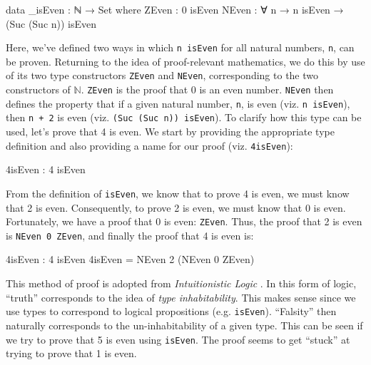 \documentclass[12pt]{article}
\begin{document}
\begin{center}
\begin{minipage}{0.7\textwidth}
\begin{code}
data _isEven : ℕ → Set where
  ZEven : 0 isEven
  NEven : ∀ n → n isEven → (Suc (Suc n)) isEven
\end{code}
\end{minipage}
\end{center}
Here, we've defined two ways in which {\tt n isEven} for all natural numbers,
{\tt n}, can be proven. Returning to the idea of proof-relevant mathematics,
we do this by use of its two type constructors {\tt ZEven} and {\tt NEven},
corresponding to the two constructors of \(\mathbb{N}\). {\tt ZEven} is the
proof that 0 is an even number. {\tt NEven} then defines the property that if
a given natural number, {\tt n}, is even (viz. {\tt n isEven}), then {\tt n + 2}
is even (viz. {\tt (Suc (Suc n)) isEven}). To clarify how this type can be used,
let's prove that 4 is even. We start by providing the appropriate type definition
and also providing a name for our proof (viz. {\tt 4isEven}):
\begin{center}
\begin{minipage}{0.5\textwidth}
\begin{code}
4isEven : 4 isEven
\end{code}
\end{minipage}
\end{center}
From the definition of {\tt isEven}, we know that to prove 4 is even, we must
know that 2 is even. Consequently, to prove 2 is even, we must know that 0 is
even. Fortunately, we have a proof that 0 is even: {\tt ZEven}. Thus, the proof
that 2 is even is {\tt NEven 0 ZEven}, and finally the proof that 4 is even is:
\begin{center}
\begin{minipage}{0.5\textwidth}
\begin{code}
4isEven : 4 isEven
4isEven = NEven 2 (NEven 0 ZEven)
\end{code}
\end{minipage}
\end{center}

This method of proof is adopted from {\em Intuitionistic Logic} \cite{}. In
this form of logic, ``truth'' corresponds to the idea of {\em type inhabitability}.
This makes sense since we use types to correspond to logical propositions
(e.g. {\tt isEven}). ``Falsity'' then naturally corresponds to the un-inhabitability
of a given type. This can be seen if we try to prove that 5 is even using
{\tt isEven}. The proof seems to get ``stuck'' at trying to prove that 1 is even.
\end{document}
